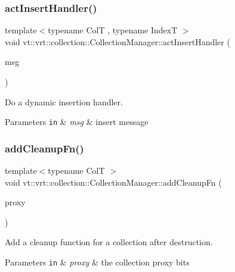 \subsubsection{\texorpdfstring{act\+Insert\+Handler()}{actInsertHandler()}}
{\footnotesize\ttfamily template$<$typename ColT , typename IndexT $>$ \\
void vt\+::vrt\+::collection\+::\+Collection\+Manager\+::act\+Insert\+Handler (\begin{DoxyParamCaption}\item[{\hyperlink{structvt_1_1vrt_1_1collection_1_1_act_insert_msg}{Act\+Insert\+Msg}$<$ ColT, IndexT $>$ $\ast$}]{msg }\end{DoxyParamCaption})\hspace{0.3cm}{\ttfamily [static]}}



Do a dynamic insertion handler. 


\begin{DoxyParams}[1]{Parameters}
\mbox{\tt in}  & {\em msg} & insert message \\
\hline
\end{DoxyParams}
\mbox{\label{structvt_1_1vrt_1_1collection_1_1_collection_manager_a3ef00b90a3a2d066a7f83b9c32b301d2}} 
\subsubsection{\texorpdfstring{add\+Cleanup\+Fn()}{addCleanupFn()}}
{\footnotesize\ttfamily template$<$typename ColT $>$ \\
void vt\+::vrt\+::collection\+::\+Collection\+Manager\+::add\+Cleanup\+Fn (\begin{DoxyParamCaption}\item[{\hyperlink{namespacevt_a1b417dd5d684f045bb58a0ede70045ac}{Virtual\+Proxy\+Type}}]{proxy }\end{DoxyParamCaption})}



Add a cleanup function for a collection after destruction. 


\begin{DoxyParams}[1]{Parameters}
\mbox{\tt in}  & {\em proxy} & the collection proxy bits \\
\hline
\end{DoxyParams}
\mbox{\label{structvt_1_1vrt_1_1collection_1_1_collection_manager_ae3dd7660105118c1ee14a125104313c6}} 
